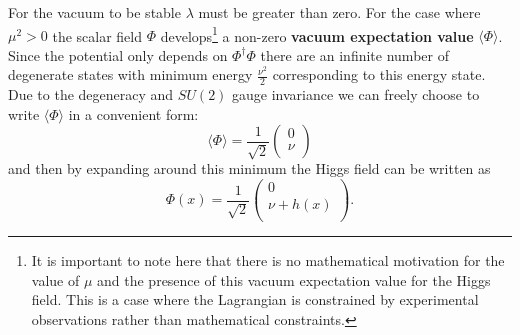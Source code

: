 For the vacuum to be stable $\lambda$ must be greater than zero. For the case where $\mu^2 > 0$ the scalar field $\Phi$ develops\footnote{It is important to note here that there is no mathematical motivation for the value of $\mu$ and the presence of this vacuum expectation value for the Higgs field. This is a case where the Lagrangian is constrained by experimental observations rather than mathematical constraints.} a non-zero \textbf{vacuum expectation value} $\langle \Phi \rangle$.
Since the potential only depends on $\Phi^\dag \Phi$ there are an infinite number of degenerate states with minimum energy $\frac{\nu^2}{2}$ corresponding to this energy state.
Due to the degeneracy and $SU(2)$ gauge invariance we can freely choose to write $\langle \Phi \rangle$ in a convenient form:
\begin{equation}
\langle \Phi \rangle = \frac{1}{\sqrt{2}} 
    \begin{pmatrix}
    0 \\
    \nu \\
    \end{pmatrix}
\end{equation}
and then by expanding around this minimum the Higgs field can be written as
\begin{equation}
\Phi(x) = \frac{1}{\sqrt{2}} 
    \begin{pmatrix}
    0 \\
    \nu  + h(x) \\
    \end{pmatrix}.
\end{equation}

